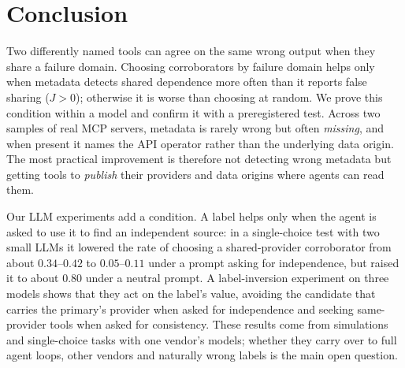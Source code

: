 \section{Conclusion}\label{sec:conclusion}

Two differently named tools can agree on the same wrong output when they share a failure domain. Choosing corroborators by failure domain helps only when metadata detects shared dependence more often than it reports false sharing ($J>0$); otherwise it is worse than choosing at random. We prove this condition within a model and confirm it with a preregistered test. Across two samples of real MCP servers, metadata is rarely wrong but often \emph{missing}, and when present it names the API operator rather than the underlying data origin. The most practical improvement is therefore not detecting wrong metadata but getting tools to \emph{publish} their providers and data origins where agents can read them.

Our LLM experiments add a condition. A label helps only when the agent is asked to use it to find an independent source: in a single-choice test with two small LLMs it lowered the rate of choosing a shared-provider corroborator from about $0.34$--$0.42$ to $0.05$--$0.11$ under a prompt asking for independence, but raised it to about $0.80$ under a neutral prompt. A label-inversion experiment on three models shows that they act on the label's value, avoiding the candidate that carries the primary's provider when asked for independence and seeking same-provider tools when asked for consistency. These results come from simulations and single-choice tasks with one vendor's models; whether they carry over to full agent loops, other vendors and naturally wrong labels is the main open question.
